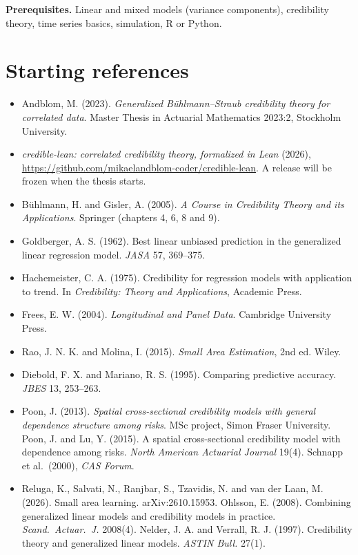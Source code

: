 \documentclass[10pt]{article}
\newcommand{\repo}{https://github.com/mikaelandblom-coder/credible-lean}
\begin{document}
\textbf{Prerequisites.} Linear and mixed models (variance components), credibility theory, time
series basics, simulation, R or Python.

\section*{Starting references}
{\small
\begin{itemize}\setlength{\itemsep}{0pt}
  \item Andblom, M. (2023). \emph{Generalized Bühlmann--Straub credibility theory for correlated
    data}. Master Thesis in Actuarial Mathematics 2023:2, Stockholm University.
  \item \emph{credible-lean: correlated credibility theory, formalized in Lean} (2026),
    \url{\repo}. A release will be frozen when the thesis starts.
  \item Bühlmann, H. and Gisler, A. (2005). \emph{A Course in Credibility Theory and its
    Applications}. Springer (chapters 4, 6, 8 and 9).
  \item Goldberger, A. S. (1962). Best linear unbiased prediction in the generalized linear
    regression model. \emph{JASA} 57, 369--375.
  \item Hachemeister, C. A. (1975). Credibility for regression models with application to trend. In
    \emph{Credibility: Theory and Applications}, Academic Press.
  \item Frees, E. W. (2004). \emph{Longitudinal and Panel Data}. Cambridge University Press.
  \item Rao, J. N. K. and Molina, I. (2015). \emph{Small Area Estimation}, 2nd ed. Wiley.
  \item Diebold, F. X. and Mariano, R. S. (1995). Comparing predictive accuracy. \emph{JBES} 13,
    253--263.
  \item Poon, J. (2013). \emph{Spatial cross-sectional credibility models with general dependence
    structure among risks}. MSc project, Simon Fraser University. Poon, J. and Lu, Y. (2015). A
    spatial cross-sectional credibility model with dependence among risks. \emph{North American
    Actuarial Journal} 19(4). Schnapp et al.\ (2000), \emph{CAS Forum}.
  \item Reluga, K., Salvati, N., Ranjbar, S., Tzavidis, N. and van der Laan, M. (2026). Small area
    learning. arXiv:2610.15953. Ohlsson, E. (2008). Combining generalized linear models and
    credibility models in practice. \emph{Scand.\ Actuar.\ J.} 2008(4). Nelder, J. A. and Verrall, R. J.
    (1997). Credibility theory and generalized linear models. \emph{ASTIN Bull.} 27(1).

\end{itemize}}
\end{document}
